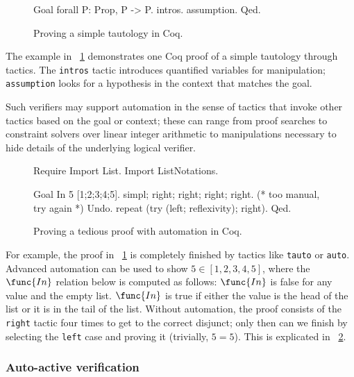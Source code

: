 \begin{figure}[ht]
\begin{coq_example}
Goal forall P: Prop, P -> P.
intros.
assumption.
Qed.
\end{coq_example}
    \caption{Proving a simple tautology in Coq.}\label{F:coq1}
\end{figure}

The example in \figurename~\ref{F:coq1} demonstrates one Coq proof of a
simple tautology through tactics. The \texttt{intros} tactic introduces
quantified variables for manipulation; \texttt{assumption} looks for a
hypothesis in the context that matches the goal.

Such verifiers may support automation in the sense of tactics that invoke other
tactics based on the goal or context; these can range from proof searches to
constraint solvers over linear integer arithmetic to manipulations necessary to
hide details of the underlying logical verifier.

\begin{figure}[ht]
\begin{coq_eval}
Require Import List.
Import ListNotations.
\end{coq_eval}
\begin{coq_example}
Goal In 5 [1;2;3;4;5].
simpl; right; right; right; right.
(* too manual, try again *) Undo.
repeat (try (left; reflexivity); right).
Qed.
\end{coq_example}
    \caption{Proving a tedious proof with automation in Coq.}\label{F:coq2}
\end{figure}

For example, the proof in \figurename~\ref{F:coq1} is completely finished by
tactics like \texttt{tauto} or \texttt{auto}. Advanced automation can be used to
show \(5 \in [1,2,3,4,5]\), where the \(\func{In}\) relation below is computed
as follows: \(\func{In}\) is false for any value and the empty list.
\(\func{In}\) is true if either the value is the head of the list or it is in
the tail of the list. Without automation, the proof consists of the
\texttt{right} tactic four times to get to the correct disjunct; only then can
we finish by selecting the \texttt{left} case and proving it (trivially, \(5 =
5\)). This is explicated in \figurename~\ref{F:coq2}.

\subsubsection{Auto-active verification}

